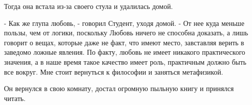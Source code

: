 \documentclass[a4paper]{article}
\theoremstyle{defin}
\theoremstyle{theorem}
\theoremstyle{prop}
\theoremstyle{lemma}
\theoremstyle{ex}
\theoremstyle{col}
\begin{document}
Тогда она встала из-за своего стула и удалилась домой.

- Как же глупа любовь, - говорил Студент, уходя домой. - От нее куда меньше пользы, чем от логики, поскольку Любовь ничего не способна доказать, а лишь говорит о вещах, которые даже не факт, что имеют место, завставляя верить в заведомо ложные явления. По факту, любовь не имеет никакого практического значения, а в наше время такое качество имеет роль, практичным должно быть все вокруг. Мне стоит вернуться к философии и заняться метафизикой.

Он вернулся в свою комнату, достал огромную пыльную книгу и принялся читать.
\end{document}
